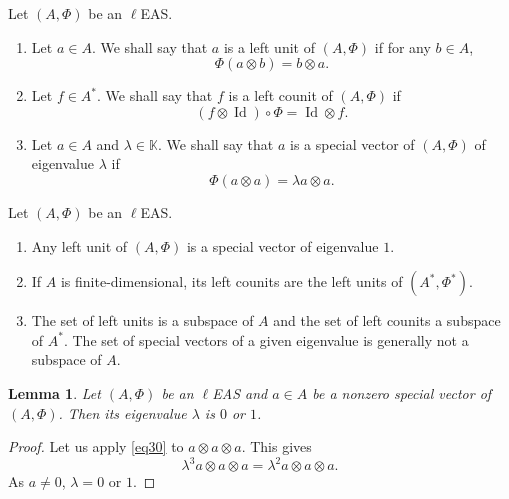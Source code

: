 \documentclass[pdftex]{sigma}
\numberwithin{equation}{section}
\newtheorem{Lemma}[Theorem]{Lemma}
\begin{document}
\begin{Definition}\label{defi4.3}
Let $(A,\Phi)$ be an $\ell$EAS.
\begin{enumerate}\itemsep=0pt
\item[(1)] Let $a\in A$. We shall say that $a$ is a left unit of $(A,\Phi)$ if for any $b\in A$,
\[
\Phi(a\otimes b)=b\otimes a.
\]
\item[(2)] Let $f \in A^*$. We shall say that $f$ is a left counit of $(A,\Phi)$ if
\[
(f \otimes \operatorname{Id})\circ \Phi=\operatorname{Id} \otimes f.
\]
\item[(3)] Let $a\in A$ and $\lambda \in \mathbb{K}$. We shall say that $a$ is a special vector of $(A,\Phi)$ of eigenvalue $\lambda$ if
 \[
 \Phi(a\otimes a)=\lambda a\otimes a.
 \]
\end{enumerate}
\end{Definition}

\begin{Remark}
Let $(A,\Phi)$ be an $\ell$EAS.
\begin{enumerate}\itemsep=0pt
\item[(1)] Any left unit of $(A,\Phi)$ is a special vector of eigenvalue $1$.
\item[(2)] If $A$ is finite-dimensional, its left counits are the left units of $(A^*,\Phi^*)$.
\item[(3)] The set of left units is a subspace of $A$ and the set of left counits a subspace of $A^*$. The set of special vectors of a given eigenvalue is generally not a subspace of $A$.
\end{enumerate}
\end{Remark}

\begin{Lemma}
Let $(A,\Phi)$ be an $\ell$EAS and $a\in A$ be a nonzero special vector of $(A,\Phi)$. Then its eigenvalue $\lambda$ is $0$ or $1$.
\end{Lemma}

\begin{proof}
Let us apply \eqref{eq30} to $a\otimes a\otimes a$. This gives
\[
\lambda^3 a\otimes a\otimes a=\lambda^2 a\otimes a\otimes a.
\] As $a\neq 0$, $\lambda=0$ or $1$.\end{proof}
\end{document}
